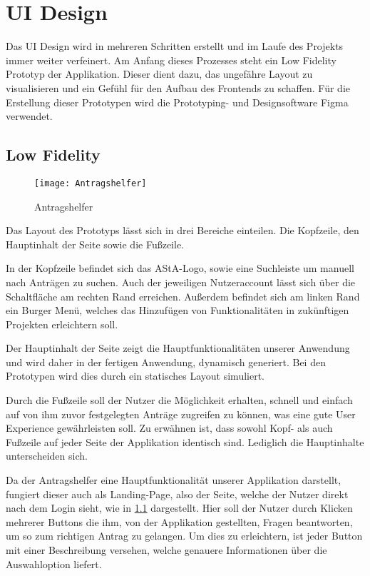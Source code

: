\chapter{UI Design}\label{ch:ui-design}
Das UI Design wird in mehreren Schritten erstellt und im Laufe des Projekts immer weiter
verfeinert. Am Anfang dieses Prozesses steht ein Low Fidelity Prototyp der Applikation.
Dieser dient dazu, das ungefähre Layout zu visualisieren und ein Gefühl für den Aufbau
des Frontends zu schaffen. Für die Erstellung dieser Prototypen wird die Prototyping- und
Designsoftware Figma verwendet.

\section{Low Fidelity}\label{Low Fidelity}
\begin{figure}[h]
  \centering
    \texttt{[image: Antragshelfer]}
    \caption{Antragshelfer}\label{Antragshelfer}
\end{figure}
Das Layout des Prototyps lässt sich in drei Bereiche einteilen. Die Kopfzeile, den
Hauptinhalt der Seite sowie die Fußzeile.

In der Kopfzeile befindet sich das AStA-Logo, sowie eine Suchleiste um manuell nach
Anträgen zu suchen. Auch der jeweiligen Nutzeraccount lässt sich über die Schaltfläche
am rechten Rand erreichen. Außerdem befindet sich am linken Rand ein Burger Menü,
welches das Hinzufügen von Funktionalitäten in zukünftigen Projekten erleichtern soll.

Der Hauptinhalt der Seite zeigt die Hauptfunktionalitäten unserer Anwendung und wird 
daher in der fertigen Anwendung, dynamisch generiert. Bei den Prototypen wird dies
durch ein statisches Layout simuliert.

Durch die Fußzeile soll der Nutzer die Möglichkeit erhalten, schnell und einfach auf von
ihm zuvor festgelegten Anträge zugreifen zu können, was eine gute User Experience
gewährleisten soll. Zu erwähnen ist, dass sowohl Kopf- als auch Fußzeile auf jeder Seite
der Applikation identisch sind. Lediglich die Hauptinhalte unterscheiden sich.

Da der Antragshelfer eine Hauptfunktionalität unserer Applikation darstellt, fungiert
dieser auch als Landing-Page, also der Seite, welche der Nutzer direkt nach dem Login
sieht, wie in \ref{Antragshelfer} dargestellt. Hier soll der Nutzer durch Klicken mehrerer Buttons die
ihm, von der Applikation gestellten, Fragen beantworten, um so zum richtigen Antrag zu
gelangen. Um dies zu erleichtern, ist jeder Button mit einer Beschreibung versehen, welche genauere Informationen über die Auswahloption liefert.

